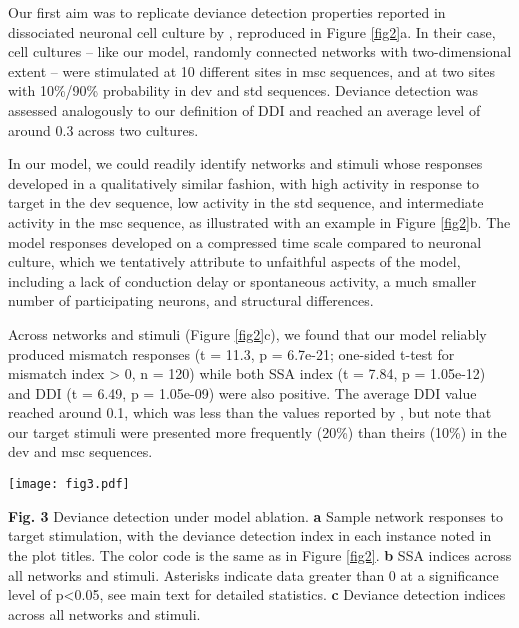 \documentclass[pdflatex,referee,iicol,sn-basic]{sn-jnl}
\theoremstyle{thmstyleone}%
\theoremstyle{thmstyletwo}%
\theoremstyle{thmstylethree}%
\begin{document}
Our first aim was to replicate deviance detection properties reported in dissociated neuronal cell culture by \cite{Kubota2021-dx}, reproduced in Figure \ref{fig2}a. In their case, cell cultures -- like our model, randomly connected networks with two-dimensional extent -- were stimulated at 10 different sites in msc sequences, and at two sites with 10\%/90\% probability in dev and std sequences. Deviance detection was assessed analogously to our definition of DDI and reached an average level of around 0.3 across two cultures.

In our model, we could readily identify networks and stimuli whose responses developed in a qualitatively similar fashion, with high activity in response to target in the dev sequence, low activity in the std sequence, and intermediate activity in the msc sequence, as illustrated with an example in Figure \ref{fig2}b. The model responses developed on a compressed time scale compared to neuronal culture, which we tentatively attribute to unfaithful aspects of the model, including a lack of conduction delay or spontaneous activity, a much smaller number of participating neurons, and structural differences.

Across networks and stimuli (Figure \ref{fig2}c), we found that our model reliably produced mismatch responses (t = 11.3, p = 6.7e-21; one-sided t-test for mismatch index > 0, n = 120) while both SSA index (t = 7.84, p = 1.05e-12) and DDI (t = 6.49, p = 1.05e-09) were also positive. The average DDI value reached around 0.1, which was less than the values reported by \cite{Kubota2021-dx}, but note that our target stimuli were presented more frequently (20\%) than theirs (10\%) in the dev and msc sequences.

\begin{figure*}%
    \centering
    \texttt{[image: fig3.pdf]}
    \caption{}
    \label{fig3}
\end{figure*}
\textbf{Fig. 3} Deviance detection under model ablation. \textbf{a} Sample network responses to target stimulation, with the deviance detection index in each instance noted in the plot titles. The color code is the same as in Figure \ref{fig2}. \textbf{b} SSA indices across all networks and stimuli. Asterisks indicate data greater than 0 at a significance level of p<0.05, see main text for detailed statistics. \textbf{c} Deviance detection indices across all networks and stimuli.
\end{document}
